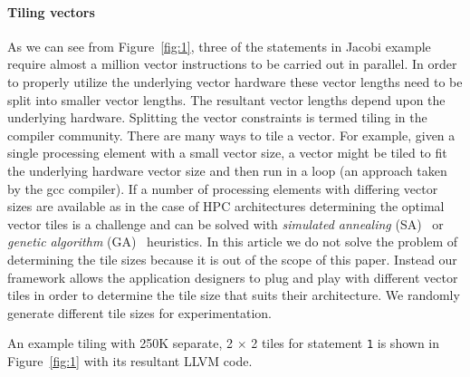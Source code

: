 \paragraph{\textbf{Tiling vectors}}
\label{sec:tiling-vector-counts}

As we can see from Figure~\ref{fig:1}, three of the statements in Jacobi
example require almost a million vector instructions to be carried out
in parallel. %
In order to properly utilize the underlying vector hardware these vector
lengths need to be split into smaller vector lengths. The resultant
vector lengths depend upon the underlying hardware. Splitting the vector
constraints is termed tiling in the compiler community. There are many
ways to tile a vector. For example, given a single processing element
with a small vector size, a vector might be tiled to fit the underlying
hardware vector size and then run in a loop (an approach taken by the
gcc compiler). If a number of processing elements with differing vector
sizes are available as in the case of HPC architectures determining the
optimal vector tiles is a challenge and can be solved with
\textit{simulated annealing} (SA)~\cite{tbra01} or \textit{genetic
  algorithm} (GA)~\cite{tbra01} heuristics. In this article we do not
solve the problem of determining the tile sizes because it is out of the scope
of this paper. Instead our framework
allows the application designers to plug and play with different vector
tiles in order to determine the tile size that suits their
architecture. We randomly generate different tile sizes for
experimentation.

An example tiling with 250K separate, 2 $\times$ 2 tiles for statement
\texttt{1} is shown in Figure~\ref{fig:1} with its resultant LLVM
code. %



